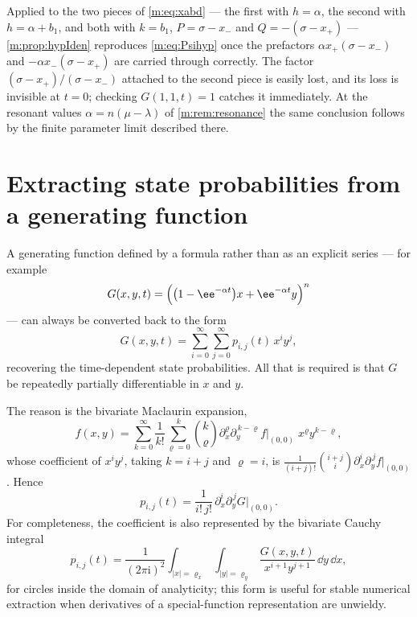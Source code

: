 \begin{remark}
Applied to the two pieces of \cref{m:eq:xabd} --- the first with $h=\alpha$, the
second with $h = \alpha+b_1$, and both with $k=b_1$, $P = \sigma-x_-$ and
$Q = -(\sigma-x_+)$ --- \cref{m:prop:hypIden} reproduces \cref{m:eq:Psihyp} once
the prefactors $\alpha x_+(\sigma-x_-)$ and $-\alpha x_-(\sigma-x_+)$ are carried
through correctly. The factor $(\sigma-x_+)/(\sigma-x_-)$ attached to the second
piece is easily lost, and its loss is invisible at $t=0$; checking $G(1,1,t)=1$
catches it immediately. At the resonant values $\alpha = n(\mu-\lambda)$ of
\cref{m:rem:resonance} the same conclusion follows by the finite parameter limit
described there.
\end{remark}

\section{Extracting state probabilities from a generating function}
\label{m:app:extract}

A generating function defined by a formula rather than as an explicit series --- for
example
\begin{equation}
\label{m:eq:examplePgf}
G(x,y,t) = \Bigl(\bigl(1-\ee^{-\alpha t}\bigr)x + \ee^{-\alpha t}y\Bigr)^n
\end{equation}
--- can always be converted back to the form
\begin{equation}
\label{m:eq:series1}
G(x,y,t) = \sum_{i=0}^{\infty}\sum_{j=0}^{\infty}p_{i,j}(t)\,x^iy^j ,
\end{equation}
recovering the time-dependent state probabilities. All that is required is that $G$
be repeatedly partially differentiable in $x$ and $y$.

The reason is the bivariate Maclaurin expansion,
\begin{equation*}
f(x,y) = \sum_{k=0}^{\infty}\frac{1}{k!}\sum_{\varrho=0}^{k}\binom{k}{\varrho}
\partial_x^{\varrho}\partial_y^{\,k-\varrho}f\Big|_{(0,0)}\;x^{\varrho}y^{k-\varrho},
\end{equation*}
whose coefficient of $x^iy^j$, taking $k=i+j$ and $\varrho=i$, is
$\frac{1}{(i+j)!}\binom{i+j}{i}\partial_x^i\partial_y^{\,j}f\big|_{(0,0)}$. Hence
\begin{equation}
\label{m:eq:stateProb}
p_{i,j}(t) = \frac{1}{i!\,j!}\,\partial_x^i\partial_y^{\,j}G\Big|_{(0,0)} .
\end{equation}
For completeness, the coefficient is also represented by the bivariate Cauchy
integral
\begin{equation}
\label{m:eq:cauchy2d}
p_{i,j}(t) = \frac{1}{(2\pi\mathrm i)^2}
\int_{|x|=\varrho_x}\int_{|y|=\varrho_y}
\frac{G(x,y,t)}{x^{i+1}y^{j+1}}\,\dd y\,\dd x ,
\end{equation}
for circles inside the domain of analyticity; this form is useful for stable
numerical extraction when derivatives of a special-function representation are
unwieldy.

